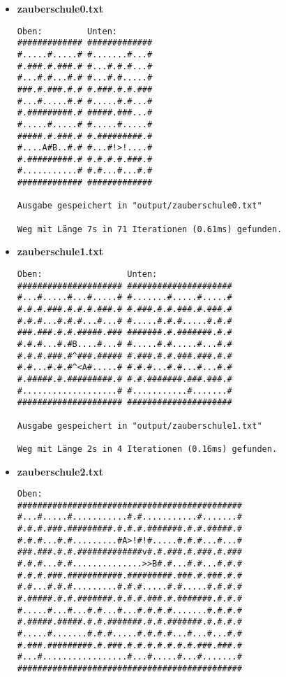 \documentclass[a4paper,12pt]{scrartcl}
\theoremstyle{definition}
\begin{document}
\begin{itemize}
	\item \textbf{zauberschule0.txt}\begin{verbatim}
Oben:         Unten:
############# #############
#.....#.....# #.......#...#
#.###.#.###.# #...#.#.#...#
#...#.#...#.# #...#.#.....#
###.#.###.#.# #.###.#.#.###
#...#.....#.# #.....#.#...#
#.#########.# #####.###...#
#.....#.....# #.....#.....#
#####.#.###.# #.#########.#
#....A#B..#.# #...#!>!....#
#.#########.# #.#.#.#.###.#
#...........# #.#...#...#.#
############# #############

Ausgabe gespeichert in "output/zauberschule0.txt"

Weg mit Länge 7s in 71 Iterationen (0.61ms) gefunden.
	\end{verbatim}
	\item \textbf{zauberschule1.txt}\begin{verbatim}
Oben:                 Unten:
##################### #####################
#...#.....#...#.....# #.......#.....#.....#
#.#.#.###.#.#.#.###.# #.###.#.#.###.#.###.#
#.#.#...#.#.#...#...# #.....#.#.#.....#.#.#
###.###.#.#.#####.### #######.#.#######.#.#
#.#.#...#.#B....#...# #.....#.#.....#...#.#
#.#.#.###.#^###.##### #.###.#.#.###.###.#.#
#.#...#.#.#^<A#.....# #.#.#...#.#...#...#.#
#.#####.#.#########.# #.#.#######.###.###.#
#...................# #...........#.......#
##################### #####################

Ausgabe gespeichert in "output/zauberschule1.txt"

Weg mit Länge 2s in 4 Iterationen (0.16ms) gefunden.
	\end{verbatim}
	\item \textbf{zauberschule2.txt}\begin{verbatim}
Oben:                                         
#############################################
#...#.....#...........#.#...........#.......#
#.#.#.###.#########.#.#.#.#######.#.#.#####.#
#.#.#...#.#.........#A>!#!#.....#.#.#...#...#
###.###.#.#.#############v#.#.###.#.###.#.###
#.#.#...#.#..............>>B#.#...#.#...#.#.#
#.#.#.###.###########.#########.###.#.###.#.#
#.#...#.#.#.........#.#.#.....#.#.....#.#.#.#
#.#####.#.#.#######.#.#.#.###.#.#######.#.#.#
#.....#...#...#.#...#...#.#.#.#.......#.#.#.#
#.#####.#####.#.#.#######.#.#.#######.#.#.#.#
#.....#.......#.#.#.....#.#.#.#...#...#...#.#
#.###.#########.#.###.#.#.#.#.#.#.#.###.###.#
#...#.................#...#.....#...#.......#
#############################################


\end{verbatim}
\end{itemize}
\end{document}
